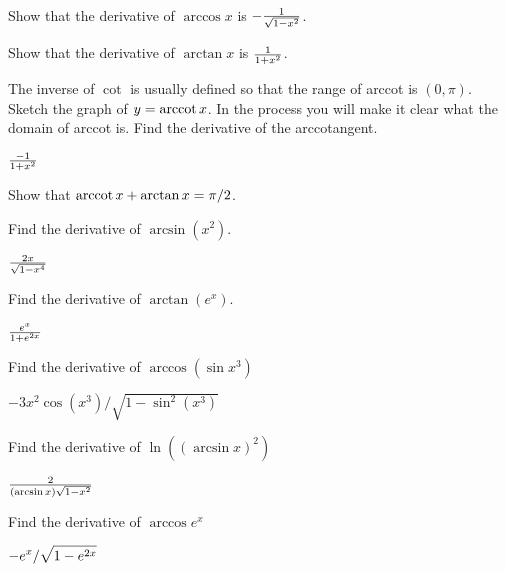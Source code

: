 \begin{exercises}

\begin{exercise} Show that the derivative of $\arccos x$ is $-{1\over
  \sqrt{1-x^2}}$. 
\end{exercise}

\begin{exercise} Show that the derivative of 
$\arctan x$ is ${1\over 1+x^2}$. 
\end{exercise}

\begin{exercise} The inverse of $\cot$ is usually defined so that the
 range of arccot is $(0, \pi )$.  Sketch the graph of $y=\operatorname{arccot}
 x$. In the process you will make it clear what the domain of arccot
 is. Find the derivative of the arccotangent.
\begin{answer} ${-1\over 1+x^2}$
\end{answer}\end{exercise}

\begin{exercise} Show that $\operatorname{arccot} x + \arctan x =\pi/2$.
\end{exercise}

\begin{exercise} Find the derivative of $\arcsin(x^2)$.
\begin{answer} ${2x\over\sqrt{1-x^4}}$
\end{answer}\end{exercise}

\begin{exercise} Find the derivative of $\arctan(e^x)$.
\begin{answer} ${e^x\over1+e^{2x}}$
\end{answer}\end{exercise}

\begin{exercise} Find the derivative of $\arccos (\sin x^3 )$
\begin{answer} $-3x^2\cos(x^3)/\sqrt{1-\sin^2(x^3)}$
\end{answer}\end{exercise}

\begin{exercise} Find the derivative of $\ln( (\arcsin x )^2)$
\begin{answer} ${2\over(\arcsin x)\sqrt{1-x^2}}$
\end{answer}\end{exercise}

\begin{exercise} Find the derivative of $\arccos e^x$
\begin{answer} $\displaystyle-e^x/\sqrt{1-e^{2x}}$
\end{answer}\end{exercise}


\end{exercises}
